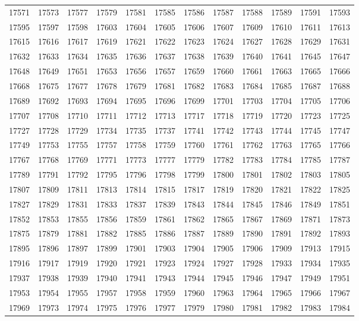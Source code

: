 \begin{center}
\begin{longtable}{llllllllllll}
17571 &17573 &17577 &17579 &17581 &17585 &17586 &17587 &17588 &17589 &17591 &17593 \\
17595 &17597 &17598 &17603 &17604 &17605 &17606 &17607 &17609 &17610 &17611 &17613 \\
17615 &17616 &17617 &17619 &17621 &17622 &17623 &17624 &17627 &17628 &17629 &17631 \\
17632 &17633 &17634 &17635 &17636 &17637 &17638 &17639 &17640 &17641 &17645 &17647 \\
17648 &17649 &17651 &17653 &17656 &17657 &17659 &17660 &17661 &17663 &17665 &17666 \\
17668 &17675 &17677 &17678 &17679 &17681 &17682 &17683 &17684 &17685 &17687 &17688 \\
17689 &17692 &17693 &17694 &17695 &17696 &17699 &17701 &17703 &17704 &17705 &17706 \\
17707 &17708 &17710 &17711 &17712 &17713 &17717 &17718 &17719 &17720 &17723 &17725 \\
17727 &17728 &17729 &17734 &17735 &17737 &17741 &17742 &17743 &17744 &17745 &17747 \\
17749 &17753 &17755 &17757 &17758 &17759 &17760 &17761 &17762 &17763 &17765 &17766 \\
17767 &17768 &17769 &17771 &17773 &17777 &17779 &17782 &17783 &17784 &17785 &17787 \\
17789 &17791 &17792 &17795 &17796 &17798 &17799 &17800 &17801 &17802 &17803 &17805 \\
17807 &17809 &17811 &17813 &17814 &17815 &17817 &17819 &17820 &17821 &17822 &17825 \\
17827 &17829 &17831 &17833 &17837 &17839 &17843 &17844 &17845 &17846 &17849 &17851 \\
17852 &17853 &17855 &17856 &17859 &17861 &17862 &17865 &17867 &17869 &17871 &17873 \\
17875 &17879 &17881 &17882 &17885 &17886 &17887 &17889 &17890 &17891 &17892 &17893 \\
17895 &17896 &17897 &17899 &17901 &17903 &17904 &17905 &17906 &17909 &17913 &17915 \\
17916 &17917 &17919 &17920 &17921 &17923 &17924 &17927 &17928 &17933 &17934 &17935 \\
17937 &17938 &17939 &17940 &17941 &17943 &17944 &17945 &17946 &17947 &17949 &17951 \\
17953 &17954 &17955 &17957 &17958 &17959 &17960 &17963 &17964 &17965 &17966 &17967 \\
17969 &17973 &17974 &17975 &17976 &17977 &17979 &17980 &17981 &17982 &17983 &17984 \\

\end{longtable}
\end{center}
